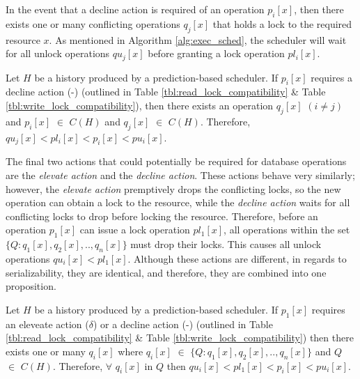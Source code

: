 In the event that a decline action is required of an operation $p_{i}[x]$, then there exists one or many conflicting operations $q_{j}[x]$ that holds a lock to the required resource $x$. As mentioned in Algorithm \ref{alg:exec_sched}, the scheduler will wait for all unlock operations $qu_{j}[x]$ before granting a lock operation $pl_{i}[x]$.

\begin{proposition}
\label{prop:decline}
Let $H$ be a history produced by  a prediction-based scheduler. If $p_{i}[x]$ requires a decline action (-) (outlined in Table \ref{tbl:read_lock_compatibility} \& Table \ref{tbl:write_lock_compatibility}), then there exists an operation $q_{j}[x]$ $(i \neq j)$ and $p_{i}[x]$ $\in$ $C(H)$ and $q_{j}[x]$ $\in$ $C(H)$. Therefore, $qu_{j}[x] < pl_{i}[x] < p_{i}[x] < pu_{i}[x]$.
\end{proposition}

The final two actions that could potentially be required for database operations are the \textit{elevate action} and the \textit{decline action}. These actions behave very similarly; however, the \textit{elevate action} premptively drops the conflicting locks, so the new operation can obtain a lock to the resource, while the \textit{decline action} waits for all conflicting locks to drop before locking the resource. Therefore, before an operation $p_{1}[x]$ can issue a lock operation $pl_{1}[x]$, all operations within the set $\{Q:q_{1}[x],q_{2}[x],..,q_{n}[x]\}$ must drop their locks. This causes all unlock operations $qu_{i}[x] < pl_{1}[x]$. Although these actions are different, in regards to serializability, they are identical, and therefore, they are combined into one proposition. 

\begin{proposition}
\label{prop:elevate_decline}
Let $H$ be a history produced by a prediction-based scheduler. If $p_{1}[x]$ requires an eleveate action ($\delta$) or a decline action (-) (outlined in Table \ref{tbl:read_lock_compatibility} \& Table \ref{tbl:write_lock_compatibility}) then there exists one or many $q_{i}[x]$ where $q_{i}[x]$ $\in$ $\{Q:q_{1}[x],q_{2}[x],..,q_{n}[x]\}$ and $Q$ $\in$ $C(H)$. Therefore, $\forall$ $q_{i}[x]$ in $Q$ then $qu_{i}[x] < pl_{1}[x] < p_{i}[x] < pu_{i}[x]$.
\end{proposition}

